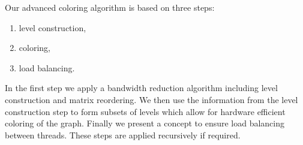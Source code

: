 
Our advanced coloring algorithm is based on three steps:
\begin{enumerate}
	\item level construction,
	\item \DK coloring,
	\item load balancing.
\end{enumerate}
In the first step we apply a bandwidth reduction algorithm
including level construction and matrix reordering. We then use the
information from the level construction step to form subsets of levels
which allow for hardware efficient \DK coloring of the graph. Finally
we present a concept to ensure load balancing between threads. These steps
are applied recursively if required.



